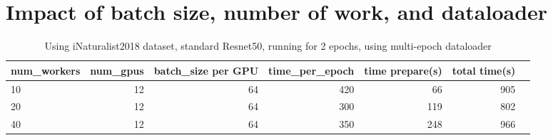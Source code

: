 \documentclass[11pt]{article}
\begin{document}

\section{Impact of batch size, number of work, and dataloader}
\begin{table}[!htp]\centering
\caption{Using iNaturalist2018 dataset, standard Resnet50, running for 2 epochs, using multi-epoch dataloader}\label{tab:int_multiepoch_dataloader}
\scriptsize
\begin{tabular}{lrrrrrr}\toprule
num\_workers &num\_gpus &batch\_size per GPU &time\_per\_epoch &time prepare(s) &total time(s) \\\midrule
10 &12 &64 &420 &66 &905 \\
20 &12 &64 &300 &119 &802 \\
40 &12 &64 &350 &248 &966 \\
\bottomrule
\end{tabular}
\end{table}
\end{document}
